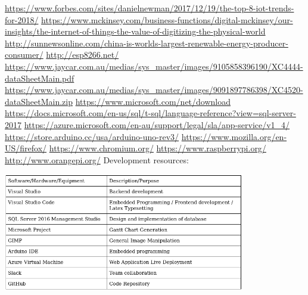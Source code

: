 \documentclass{article}
\begin{document}
    \begin{thebibliography}{9}
        \raggedright
            \url{https://www.forbes.com/sites/danielnewman/2017/12/19/the-top-8-iot-trends-for-2018/}
            \url{https://www.mckinsey.com/business-functions/digital-mckinsey/our-insights/the-internet-of-things-the-value-of-digitizing-the-physical-world}
            \url{http://sunnewsonline.com/china-is-worlds-largest-renewable-energy-producer-consumer/}
            \url{http://esp8266.net/}
            \url{https://www.jaycar.com.au/medias/sys_master/images/9105858396190/XC4444-dataSheetMain.pdf}
            \url{https://www.jaycar.com.au/medias/sys_master/images/9091897786398/XC4520-dataSheetMain.zip}
            \url{https://www.microsoft.com/net/download}
            \url{https://docs.microsoft.com/en-us/sql/t-sql/language-reference?view=sql-server-2017}
            \url{https://azure.microsoft.com/en-au/support/legal/sla/app-service/v1_4/}
            \url{https://store.arduino.cc/usa/arduino-uno-rev3/}
            \url{https://www.mozilla.org/en-US/firefox/}
            \url{https://www.chromium.org/}
            \url{https://www.raspberrypi.org/}
            \url{http://www.orangepi.org/}
            Development resources:
            \begin{center}
                \includegraphics[width=400px]{Images/DevelopmentResources.jpg}
            \end{center}
    \end{thebibliography}

    
\end{document}
